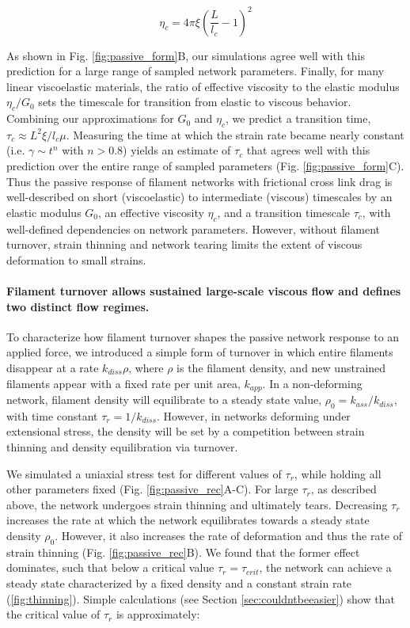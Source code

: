 \begin{equation}
	\eta_c = 4\pi\xi\left ( \frac{L}{l_c}-1\right )^2
\end{equation}


As shown in Fig. \ref{fig:passive_form}B, our simulations agree well with this prediction for a large range of sampled network parameters. Finally, for many linear viscoelastic materials, the ratio of effective viscosity to the elastic modulus $\eta_c/G_0$ sets the timescale for transition from elastic to viscous behavior\cite{mccrum1997principles}. Combining our approximations for $G_0$ and $\eta_c$, we predict a transition time, $\tau_c \approx L^2\xi/l_c\mu$. Measuring the time at which the strain rate became nearly constant (i.e. $\gamma \sim t^n$ with $n>0.8$) yields an estimate of $\tau_c$ that agrees well with this prediction over the entire range of sampled parameters (Fig. \ref{fig:passive_form}C).  Thus the passive response of filament networks with frictional cross link drag is well-described on short (viscoelastic) to intermediate (viscous) timescales by an elastic modulus $G_0$, an effective viscosity $\eta_c$, and a transition timescale $\tau_c$, with well-defined dependencies on network parameters. However, without filament turnover, strain thinning and network tearing limits the extent of viscous deformation to small strains.

\paragraph{Filament turnover allows sustained large-scale viscous flow and defines two distinct flow regimes.} 


To characterize how filament turnover shapes the passive network response to an applied force, we introduced a simple form of turnover in which entire filaments disappear at a rate $k_{diss}\rho$, where $\rho$ is the filament density, and new unstrained filaments appear with a fixed rate per unit area, $k_{app}$. In a non-deforming network,  filament density will equilibrate to a steady state value, $\rho_0 = k_{ass}/k_{diss}$, with time constant $\tau_r = 1/k_{diss}$.  However, in networks deforming under extensional stress, the density will be set by a competition between strain thinning and density equilibration via turnover. 

We simulated a uniaxial stress test for different values of $\tau_r$, while holding all other parameters fixed (Fig. \ref{fig:passive_rec}A-C). For large $\tau_r$, as described above, the network undergoes strain thinning and ultimately tears.  Decreasing $\tau_r$ increases the rate at which the network equilibrates towards a steady state density $\rho_0$.  However, it also increases the rate of deformation and thus the rate of strain thinning (Fig. \ref{fig:passive_rec}B).  We found that the former effect dominates, such that below a critical value $\tau_r = \tau_{crit}$, the network can achieve a steady state characterized by a fixed density and a constant strain rate (\ref{fig:thinning}).  Simple calculations (see Section \ref{sec:couldntbeeasier}) show that the critical value of $\tau_r$ is approximately:

